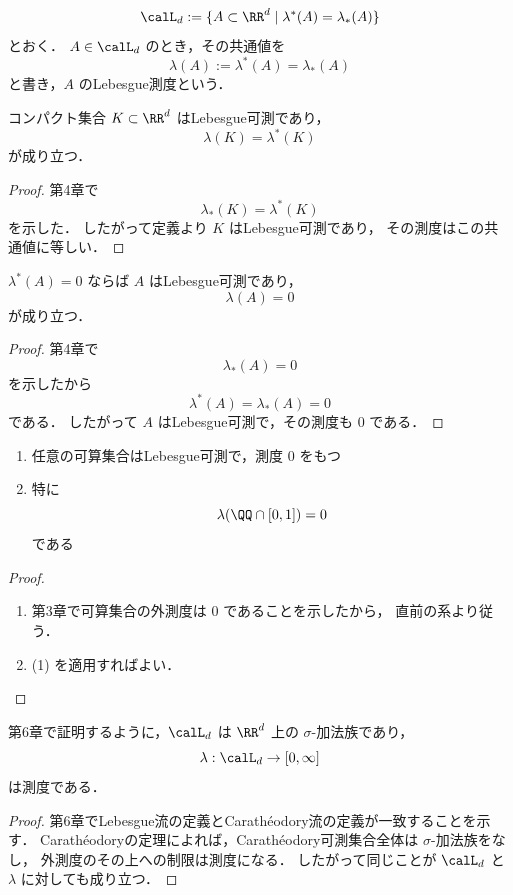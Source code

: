 \begin{definition}[Lebesgue可測集合とLebesgue測度]
\[
\calL_d
:=
\{A \subset \RR^d \mid \lambda^*(A)=\lambda_*(A)\}
\]
とおく．
$A \in \calL_d$ のとき，その共通値を
\[
\lambda(A)
:=
\lambda^*(A)=\lambda_*(A)
\]
と書き，$A$ のLebesgue測度という．
\end{definition}

\begin{proposition}[コンパクト集合はLebesgue可測]
コンパクト集合 $K \subset \RR^d$ はLebesgue可測であり，
\[
\lambda(K)=\lambda^*(K)
\]
が成り立つ．
\end{proposition}
\begin{proof}
第4章で
\[
\lambda_*(K)=\lambda^*(K)
\]
を示した．
したがって定義より $K$ はLebesgue可測であり，
その測度はこの共通値に等しい．
\end{proof}

\begin{corollary}[外測度零集合はLebesgue可測]
$\lambda^*(A)=0$ ならば $A$ はLebesgue可測であり，
\[
\lambda(A)=0
\]
が成り立つ．
\end{corollary}
\begin{proof}
第4章で
\[
\lambda_*(A)=0
\]
を示したから
\[
\lambda^*(A)=\lambda_*(A)=0
\]
である．
したがって $A$ はLebesgue可測で，その測度も $0$ である．
\end{proof}

\begin{example}
\begin{enumerate}
    \item 任意の可算集合はLebesgue可測で，測度 $0$ をもつ
    \item 特に
    \[
    \lambda(\QQ \cap [0,1])=0
    \]
    である
\end{enumerate}
\end{example}
\begin{proof}
\begin{enumerate}
    \item 第3章で可算集合の外測度は $0$ であることを示したから，
    直前の系より従う．
    \item (1) を適用すればよい．
\end{enumerate}
\end{proof}

\begin{theorem}[基本定理]
第6章で証明するように，$\calL_d$ は $\RR^d$ 上の $\sigma$-加法族であり，
\[
\lambda:\calL_d\to[0,\infty]
\]
は測度である．
\end{theorem}
\begin{proof}
第6章でLebesgue流の定義とCarathéodory流の定義が一致することを示す．
Carathéodoryの定理によれば，Carathéodory可測集合全体は $\sigma$-加法族をなし，
外測度のその上への制限は測度になる．
したがって同じことが $\calL_d$ と $\lambda$ に対しても成り立つ．
\end{proof}

